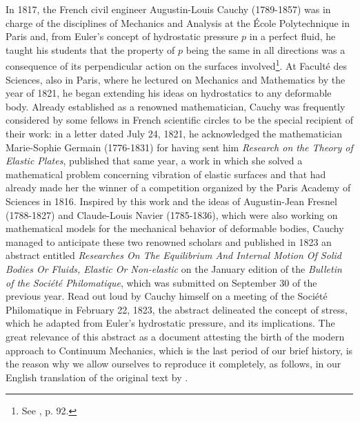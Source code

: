 In 1817, the French civil engineer Augustin-Louis Cauchy (1789-1857) was in charge of the disciplines of Mechanics and Analysis at the \'Ecole Polytechnique in Paris and, from Euler's concept of hydrostatic pressure $p$ in a perfect fluid, he taught his students that the property of $p$ being the same in all directions was a consequence of its perpendicular action on the surfaces involved\footnote{See \cite{belhoste_1991_1}, p. 92.}. At Facult\'e des Sciences, also in Paris, where he lectured on Mechanics and Mathematics by the year of 1821, he began extending his ideas on hydrostatics to any deformable body. Already established as a renowned mathematician, Cauchy was frequently considered by some fellows in French scientific circles to be the special recipient of their work: in a letter dated July 24, 1821, he acknowledged the mathematician Marie-Sophie Germain (1776-1831) for having sent him \emph{Research on the Theory of Elastic Plates}, published that same year, a work in which she solved a mathematical problem concerning vibration of elastic surfaces and that had already made her the winner of a competition organized by the Paris Academy of Sciences in 1816. Inspired by this work and the ideas of Augustin-Jean Fresnel (1788-1827) and Claude-Louis Navier (1785-1836), which were also working on mathematical models for the mechanical behavior of deformable bodies, Cauchy managed to anticipate these two renowned scholars and published in 1823 an abstract entitled \emph{Researches On The Equilibrium And Internal Motion Of Solid Bodies Or Fluids, Elastic Or Non-elastic} on the January edition of the \emph{Bulletin of the Soci\'et\'e Philomatique}, which was submitted on September 30 of the previous year. Read out loud by Cauchy himself on a meeting of the Soci\'et\'e Philomatique in February 22, 1823, the abstract delineated the concept of stress, which he adapted from Euler's hydrostatic pressure, and its implications. The great relevance of this abstract as a document attesting the birth of the modern approach to Continuum Mechanics, which is the last period of our brief history, is the reason why we allow ourselves to reproduce it completely, as follows, in our English translation of the original text by \cite{cauchy_1823}.



